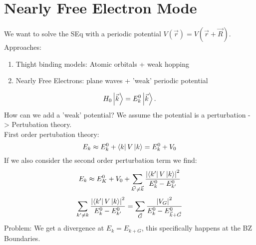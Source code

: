 \documentclass{report}
\begin{document}
\section{Nearly Free Electron Mode}
We want to solve the SEq with a periodic potential $V(\vec{r}) = V(\vec{r} + \vec{R})$.
Approaches:
\begin{enumerate}
	\item Thight binding models: Atomic orbitals + weak hopping
	\item Nearly Free Electrons: plane waves + 'weak' periodic potential
\end{enumerate}
\[
H_0 \ket{\vec{k}} = E_k^0 \ket{\vec{k}} 
.\] How can we add a 'weak' potential? We assume the potential is a perturbation -> Pertubation theory.\\
First order pertubation theory: \[
E_k \approx E_k^0 + \bra{k} V \ket{k} = E_k^0 + V_0 
\] If we also consider the second order perturbation term we find: \[
E_k \approx E_K^0 + V_0 + \sum_{\vec{k'} \neq \vec{k}} \frac{\abs{\bra{k'} V \ket{k} }^2}{E_k^0 - E_{k'}^0}
\] \[
\sum_{k' \neq k} \frac{\abs{\bra{k'} V \ket{k} }^2}{E_k^0 - E_{k'}^0} = \sum_{\vec{G}} \frac{\abs{V_G}^2}{E_k^0 - E_{\vec{k}+\vec{G}}^0}
\] Problem: We get a divergence at $E_k = E_{k + G}$, this specifically happens at the BZ Boundaries.  
\end{document}
